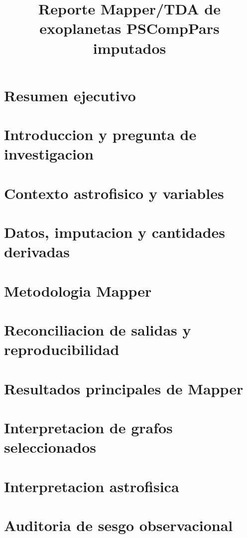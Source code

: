 \documentclass[11pt]{article}
\title{Reporte Mapper/TDA de exoplanetas PSCompPars imputados}
\author{}
\date{}
\begin{document}
\maketitle

\newpage
\section{Resumen ejecutivo}

\newpage
\section{Introduccion y pregunta de investigacion}

\section{Contexto astrofisico y variables}

\section{Datos, imputacion y cantidades derivadas}

\section{Metodologia Mapper}

\section{Reconciliacion de salidas y reproducibilidad}

\section{Resultados principales de Mapper}

\section{Interpretacion de grafos seleccionados}

\section{Interpretacion astrofisica}

\section{Auditoria de sesgo observacional}

\end{document}
